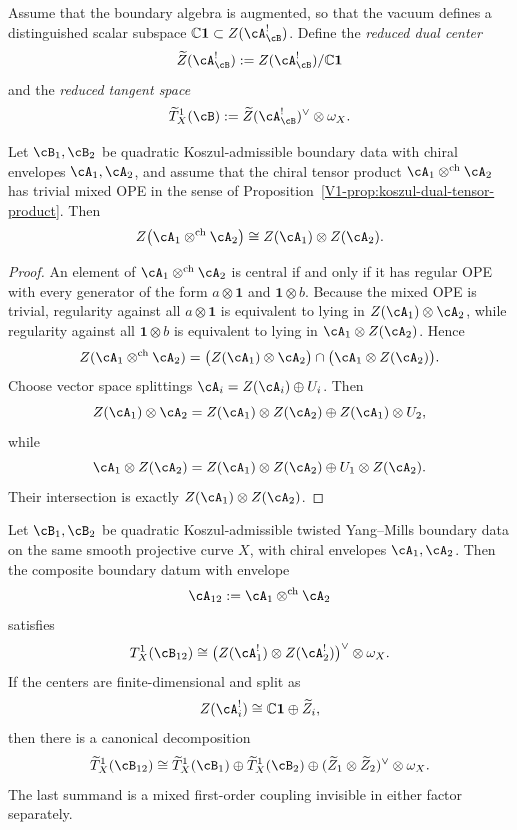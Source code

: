 \begin{definition}
\label{def:twisted-ym-reduced-center}
Assume that the boundary algebra is augmented, so that the vacuum defines a distinguished scalar subspace $\mathbb{C}\mathbf{1} \subset Z(\cA_{\cB}^{!})$. Define the \emph{reduced dual center}
\[
\widetilde Z(\cA_{\cB}^{!}) := Z(\cA_{\cB}^{!})/\mathbb{C}\mathbf{1}
\]
and the \emph{reduced tangent space}
\[
\widetilde T^1_X(\cB) := \widetilde Z(\cA_{\cB}^{!})^{\vee}\otimes \omega_X.
\]
\end{definition}

\begin{lemma}
\label{lem:twisted-ym-center-tensor}
Let $\cB_1,\cB_2$ be quadratic Koszul-admissible boundary data with chiral envelopes $\cA_1,\cA_2$, and assume that the chiral tensor product $\cA_1\otimes^{\mathrm{ch}}\cA_2$ has trivial mixed OPE\/ in the sense of Proposition~\ref{V1-prop:koszul-dual-tensor-product}. Then
\[
Z\bigl(\cA_1\otimes^{\mathrm{ch}}\cA_2\bigr)
\cong
Z(\cA_1)\otimes Z(\cA_2).
\]
\end{lemma}

\begin{proof}
An element of $\cA_1\otimes^{\mathrm{ch}}\cA_2$ is central if and only if it has regular OPE with every generator of the form $a\otimes \mathbf{1}$ and $\mathbf{1}\otimes b$. Because the mixed OPE is trivial, regularity against all $a\otimes \mathbf{1}$ is equivalent to lying in $Z(\cA_1)\otimes \cA_2$, while regularity against all $\mathbf{1}\otimes b$ is equivalent to lying in $\cA_1\otimes Z(\cA_2)$. Hence
\[
Z(\cA_1\otimes^{\mathrm{ch}}\cA_2)
=
\bigl(Z(\cA_1)\otimes \cA_2\bigr)
\cap
\bigl(\cA_1\otimes Z(\cA_2)\bigr).
\]
Choose vector space splittings $\cA_i = Z(\cA_i)\oplus U_i$. Then
\[
Z(\cA_1)\otimes \cA_2
=
Z(\cA_1)\otimes Z(\cA_2)
\oplus
Z(\cA_1)\otimes U_2,
\]
while
\[
\cA_1\otimes Z(\cA_2)
=
Z(\cA_1)\otimes Z(\cA_2)
\oplus
U_1\otimes Z(\cA_2).
\]
Their intersection is exactly $Z(\cA_1)\otimes Z(\cA_2)$.
\end{proof}

\begin{theorem}
\label{thm:twisted-ym-binary-mixed-couplings}
Let $\cB_1,\cB_2$ be quadratic Koszul-admissible twisted Yang--Mills boundary data on the same smooth projective curve $X$, with chiral envelopes $\cA_1,\cA_2$. Then the composite boundary datum with envelope
\[
\cA_{12}:=\cA_1\otimes^{\mathrm{ch}}\cA_2
\]
satisfies
\[
T^1_X(\cB_{12})
\cong
\bigl(Z(\cA_1^{!})\otimes Z(\cA_2^{!})\bigr)^{\vee}\otimes \omega_X.
\]
If the centers are finite-dimensional and split as
\[
Z(\cA_i^{!}) \cong \mathbb{C}\mathbf{1}\oplus \widetilde Z_i,
\]
then there is a canonical decomposition
\[
\widetilde T^1_X(\cB_{12})
\cong
\widetilde T^1_X(\cB_1)
\oplus
\widetilde T^1_X(\cB_2)
\oplus
(\widetilde Z_1\otimes \widetilde Z_2)^{\vee}\otimes \omega_X.
\]
The last summand is a mixed first-order coupling invisible in either factor separately.
\end{theorem}

